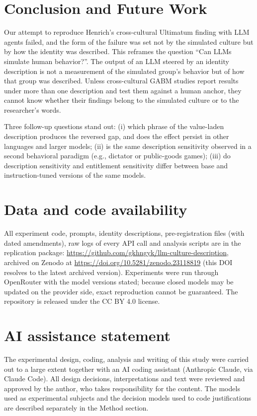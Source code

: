 \documentclass[11pt]{article}
\begin{document}
\section{Conclusion and Future Work}

Our attempt to reproduce Henrich's cross-cultural Ultimatum finding with LLM agents failed, and the form of the failure was set not by the simulated culture but by how the identity was described. This reframes the question ``Can LLMs simulate human behavior?''. The output of an LLM steered by an identity description is not a measurement of the simulated group's behavior but of how that group was described. Unless cross-cultural GABM studies report results under more than one description and test them against a human anchor, they cannot know whether their findings belong to the simulated culture or to the researcher's words.

Three follow-up questions stand out: (i) which phrase of the value-laden description produces the reversed gap, and does the effect persist in other languages and larger models; (ii) is the same description sensitivity observed in a second behavioral paradigm (e.g., dictator or public-goods games); (iii) do description sensitivity and entitlement sensitivity differ between base and instruction-tuned versions of the same models.


\section*{Data and code availability}

All experiment code, prompts, identity descriptions, pre-registration files (with dated amendments), raw logs of every API call and analysis scripts are in the replication package: \url{https://github.com/gkhngyk/llm-culture-description}, archived on Zenodo at \url{https://doi.org/10.5281/zenodo.23118819} (this DOI resolves to the latest archived version). Experiments were run through OpenRouter with the model versions stated; because closed models may be updated on the provider side, exact reproduction cannot be guaranteed. The repository is released under the CC BY 4.0 license.

\section*{AI assistance statement}

The experimental design, coding, analysis and writing of this study were carried out to a large extent together with an AI coding assistant (Anthropic Claude, via Claude Code). All design decisions, interpretations and text were reviewed and approved by the author, who takes responsibility for the content. The models used as experimental subjects and the decision models used to code justifications are described separately in the Method section.
\end{document}
